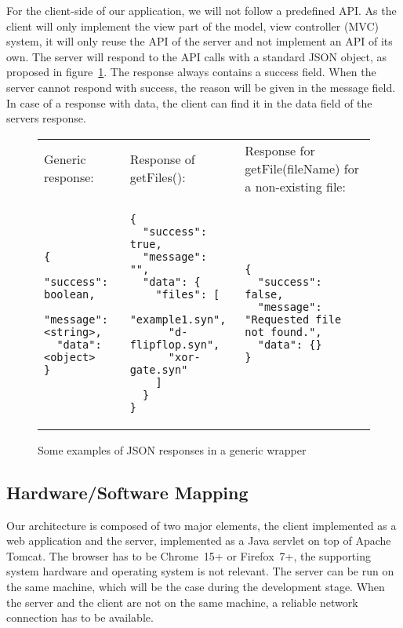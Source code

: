 \documentclass[a4paper]{article}
\begin{document}
For the client-side of our application, we will not follow a predefined API. As the client will only implement the view part of the model, view controller (MVC) system, it will only reuse the API of the server and not implement an API of its own. The server will respond to the API calls with a standard JSON object, as proposed in figure~\ref{fig-jsonDefault}. The response always contains a success field. When the server cannot respond with success, the reason will be given in the message field. In case of a response with data, the client can find it in the data field of the servers response. \\

\begin{figure}[h!]
\caption{Some examples of JSON responses in a generic wrapper}
\label{fig-jsonDefault}
{\footnotesize
\begin{tabular}{p{4.3cm} p{4.3cm} p{4.3cm}}
\\
        Generic response: &
        Response of getFiles(): &
        Response for getFile(fileName) for a non-existing file: \\
\begin{verbatim}
{
  "success": boolean,
  "message": <string>,
  "data": <object>
}
\end{verbatim}

&

\begin{verbatim}
{
  "success": true,
  "message": "",
  "data": {
    "files": [
      "example1.syn",
      "d-flipflop.syn",
      "xor-gate.syn"
    ]
  }
}
\end{verbatim}

&

\begin{verbatim}
{
  "success": false,
  "message": "Requested file not found.",
  "data": {}
}
\end{verbatim}
\\
\end{tabular} }

\end{figure}

\pagebreak
\pagebreak

\subsection{Hardware/Software Mapping}
Our architecture is composed of two major elements, the client implemented as a web application and the server, implemented as a Java servlet on top of Apache Tomcat. The browser has to be Chrome~15+ or Firefox~7+, the supporting system hardware and operating system is not relevant. The server can be run on the same machine, which will be the case during the development stage. When the server and the client are not on the same machine, a reliable network connection has to be available.
\end{document}
